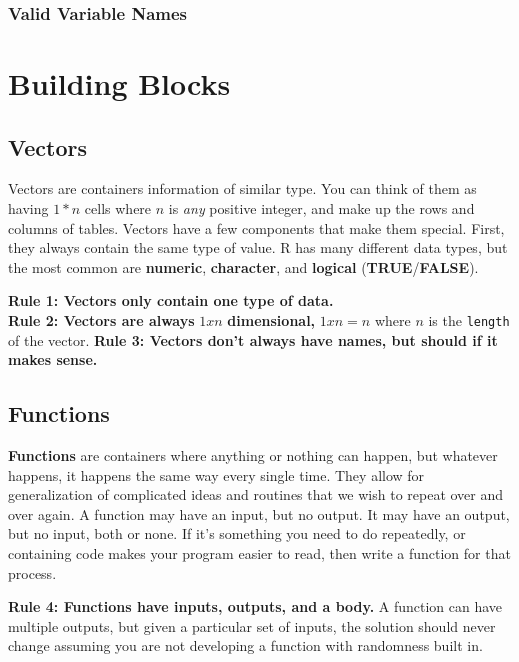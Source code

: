 \documentclass[
]{book}
\begin{document}
\hypertarget{valid-variable-names}{%
\subsection{Valid Variable Names}\label{valid-variable-names}}

\hypertarget{functions}{%
\chapter{Building Blocks}\label{functions}}

\hypertarget{vectors}{%
\section{Vectors}\label{vectors}}

Vectors are containers information of similar type. You can think of them as having \(1*n\) cells where \(n\) is \emph{any} positive integer, and make up the rows and columns of tables. Vectors have a few components that make them special. First, they always contain the same type of value. R has many different data types, but the most common are \textbf{numeric}, \textbf{character}, and \textbf{logical} (\textbf{TRUE}/\textbf{FALSE}).

\textbf{Rule 1: Vectors only contain one type of data.\\
Rule 2: Vectors are always} \(1xn\) \textbf{dimensional,} \(1xn=n\) where \(n\) is the \texttt{length} of the vector. \textbf{\hfill\break
Rule 3: Vectors don't always have names, but should if it makes sense.}

\hypertarget{functions-1}{%
\section{Functions}\label{functions-1}}

\textbf{Functions} are containers where anything or nothing can happen, but whatever happens, it happens the same way every single time. They allow for generalization of complicated ideas and routines that we wish to repeat over and over again. A function may have an input, but no output. It may have an output, but no input, both or none. If it's something you need to do repeatedly, or containing code makes your program easier to read, then write a function for that process.

\textbf{Rule 4: Functions have inputs, outputs, and a body.} A function can have multiple outputs, but given a particular set of inputs, the solution should never change assuming you are not developing a function with randomness built in.
\end{document}
